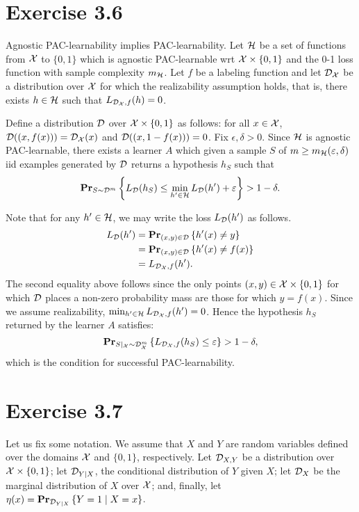 \section*{Exercise 3.6}

Agnostic PAC-learnability implies PAC-learnability. Let $\mathcal{H}$ be a set of
functions from $\mathcal{X}$ to $\{0, 1\}$ which is agnostic PAC-learnable wrt $\mathcal{X}
\times \{0, 1\}$ and the 0-1 loss function with sample complexity
$m_{\mathcal{\mathcal{H}}}$.  Let $f$ be a labeling function and let
$\mathcal{D}_{\mathcal{X}}$ be a distribution over $\mathcal{X}$ for which the realizability
assumption holds, that is, there exists $h \in \mathcal{H}$ such that
$L_{\mathcal{D}_{\mathcal{X}}, f } (h) = 0$.

Define a distribution $\mathcal{D}$ over $\mathcal{X} \times \{0, 1\}$ as follows: for all
$x \in \mathcal{X}$, $\mathcal{D}( (x, f(x)) ) = \mathcal{D}_{\mathcal{X}}(x)$ and $\mathcal{D}( (x, 1 - f(x)))
= 0$. Fix $\epsilon, \delta > 0$. Since $\mathcal{H}$ is agnostic PAC-learnable,
there exists a learner $A$ which given a sample $S$ of $m \geq
m_{\mathcal{H}}(\varepsilon, \delta)$ iid examples generated by $\mathcal{D}$ returns a
hypothesis $h_S$ such that
\[
    \mathbf{Pr}_{S \sim \mathcal{D}^m} \left \{ L_{\mathcal{D}} (h_S) \leq
        \min_{h' \in \mathcal{H}} L_{\mathcal{D}} (h') + \varepsilon \right \} > 1 - \delta.
\]

Note that for any $h' \in \mathcal{H}$, we may write the loss $L_{\mathcal{D}} (h')$ as follows.
\begin{align*}
    L_{\mathcal{D}} (h') & = \mathbf{Pr}_{(x, y) \in \mathcal{D}} \left \{  h'(x) \neq y \right \} \\
                   & = \mathbf{Pr}_{(x, y) \in \mathcal{D}} \left \{  h'(x) \neq f(x) \right \} \\
                   & = L_{\mathcal{D}_{\mathcal{X}}, f} (h').
\end{align*}
The second equality above follows since the only points $(x, y) \in \mathcal{X} \times \{0, 1\}$
for which $\mathcal{D}$ places a non-zero probability mass are those for which $y = f(x)$. Since
we assume realizability, $ \min_{h' \in \mathcal{H}} L_{\mathcal{D}_{\mathcal{X}}, f} (h') = 0$. Hence
the hypothesis $h_S$ returned by the learner $A$ satisfies:
\[
    \mathbf{Pr}_{S|_{\mathcal{X}} \sim \mathcal{D}_{\mathcal{X}}^m} \left \{ L_{\mathcal{D}_{\mathcal{X}}, f} (h_S) \leq \varepsilon \right \}
        > 1 - \delta,
\]
which is the condition for successful PAC-learnability.

\section*{Exercise 3.7} Let us fix some notation. We assume that $X$ and $Y$ are
random variables defined over the domains $\mathcal{X}$ and $\{0, 1\}$, respectively.
Let $\mathcal{D}_{X, Y}$ be a distribution over $\mathcal{X} \times \{0, 1\}$;
let $\mathcal{D}_{Y \mid X}$, the conditional distribution of $Y$ given $X$;
let $\mathcal{D}_{X}$ be the marginal distribution of $X$ over $\mathcal{X}$; and, finally, let
$\eta(x) = \mathbf{Pr}_{\mathcal{D}_{Y \mid X}} \left \{ Y = 1 \mid X = x \right \}$.

